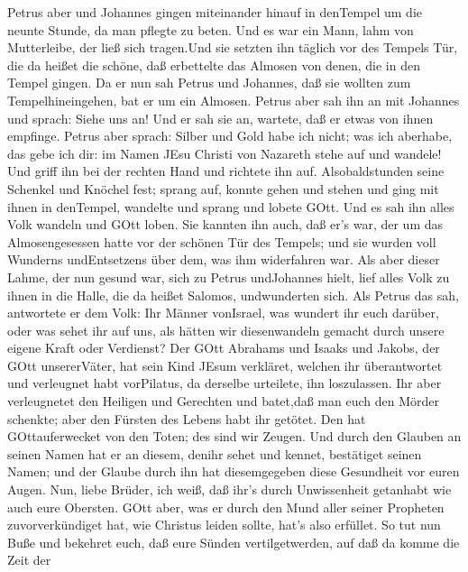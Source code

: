  Petrus aber und Johannes gingen miteinander hinauf in
denTempel um die neunte Stunde, da man pflegte zu beten. 
Und es war ein Mann, lahm von Mutterleibe, der ließ sich tragen.Und sie
setzten ihn täglich vor des Tempels Tür, die da heißet die schöne, daß
erbettelte das Almosen von denen, die in den Tempel gingen. 
Da er nun sah Petrus und Johannes, daß sie wollten zum
Tempelhineingehen, bat er um ein Almosen.  Petrus aber sah
ihn an mit Johannes und sprach: Siehe uns an!  Und er sah
sie an, wartete, daß er etwas von ihnen empfinge.  Petrus
aber sprach: Silber und Gold habe ich nicht; was ich aberhabe, das gebe
ich dir: im Namen JEsu Christi von Nazareth stehe auf und wandele!
 Und griff ihn bei der rechten Hand und richtete ihn auf.
Alsobaldstunden seine Schenkel und Knöchel fest;  sprang
auf, konnte gehen und stehen und ging mit ihnen in denTempel, wandelte
und sprang und lobete GOtt.  Und es sah ihn alles Volk
wandeln und GOtt loben.  Sie kannten ihn auch, daß er's
war, der um das Almosengesessen hatte vor der schönen Tür des Tempels;
und sie wurden voll Wunderns undEntsetzens über dem, was ihm widerfahren
war.  Als aber dieser Lahme, der nun gesund war, sich zu
Petrus undJohannes hielt, lief alles Volk zu ihnen in die Halle, die da
heißet Salomos, undwunderten sich.  Als Petrus das sah,
antwortete er dem Volk: Ihr Männer vonIsrael, was wundert ihr euch
darüber, oder was sehet ihr auf uns, als hätten wir diesenwandeln
gemacht durch unsere eigene Kraft oder Verdienst?  Der GOtt
Abrahams und Isaaks und Jakobs, der GOtt unsererVäter, hat sein Kind
JEsum verkläret, welchen ihr überantwortet und verleugnet habt
vorPilatus, da derselbe urteilete, ihn loszulassen.  Ihr
aber verleugnetet den Heiligen und Gerechten und batet,daß man euch den
Mörder schenkte;  aber den Fürsten des Lebens habt ihr
getötet. Den hat GOttauferwecket von den Toten; des sind wir Zeugen.
 Und durch den Glauben an seinen Namen hat er an diesem,
denihr sehet und kennet, bestätiget seinen Namen; und der Glaube durch
ihn hat diesemgegeben diese Gesundheit vor euren Augen. 
Nun, liebe Brüder, ich weiß, daß ihr's durch Unwissenheit getanhabt wie
auch eure Obersten.  GOtt aber, was er durch den Mund aller
seiner Propheten zuvorverkündiget hat, wie Christus leiden sollte, hat's
also erfüllet.  So tut nun Buße und bekehret euch, daß eure
Sünden vertilgetwerden,  auf daß da komme die Zeit der
